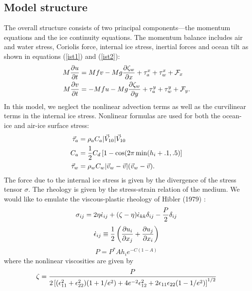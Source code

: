 \subsection{Model structure}
The overall structure consists of two principal components---the
momentum equations and the ice continuity equations.  The momentum
balance includes air and water stress, Coriolis force, internal ice
stress, inertial forces and ocean tilt as shown in equations
(\ref{ist1}) and (\ref{ist2}):
\begin{align}
  M {\partial u \over \partial t}
 & = Mfv - Mg {\partial \zeta_w \over \partial x} +
 \tau_a^x + \tau_w^x + {\cal F}_x
\label{ist1} \\
  M {\partial v \over \partial t}
 & = - Mfu - Mg {\partial \zeta_w \over \partial y} +
 \tau_a^y + \tau_w^y + {\cal F}_y.
\label{ist2}
\end{align}
In this model, we neglect the nonlinear advection terms as well as
the curvilinear terms in the internal ice stress.
Nonlinear formulas are used for both the ocean-ice and air-ice surface
stress:
\begin{align}
  \vec{\tau}_a & = \rho_a C_a | \vec{V}_{10} | \vec{V}_{10} \\
  C_a & = {1 \over 2} C_d \left[ 1 - \cos( 2 \pi \min(h_i+.1, .5)
  \right] \\
  \vec{\tau}_w & = \rho_w C_w | \vec{v}_w - \vec{v} |
  ( \vec{v}_w - \vec{v}) .
\end{align}
The force due to
the internal ice stress is given by the divergence of the stress
tensor $\sigma$. The rheology is given by the stress-strain relation
of the medium. We would like to emulate the viscous-plastic rheology
of Hibler (1979) \cite{Hibler79}:
\begin{equation}
  \sigma_{ij} = 2 \eta \dot \epsilon_{ij} + (\zeta - \eta) \dot
  \epsilon_{kk} \delta_{ij} - {P \over 2} \delta_{ij}
\end{equation}
\begin{equation}
  \dot \epsilon_{ij} \equiv {1 \over 2} \left( {\partial u_i \over
  \partial x_j} + {\partial u_j \over \partial x_i} \right)
\end{equation}
\begin{equation}
  P = P^* A h_i e^{-C(1-A)}
\end{equation}
where the nonlinear viscosities are given by
\begin{equation}
\zeta = { P \over 2 \left[ (\epsilon^2_{11} +
   \epsilon^2_{22} ) ( 1 + 1/e^2 ) + 4 e^{-2} \epsilon^2_{12}
      + 2 \epsilon_{11} \epsilon_{22} ( 1 - 1/e^2 ) \right] ^{1/2} }
\end{equation}
